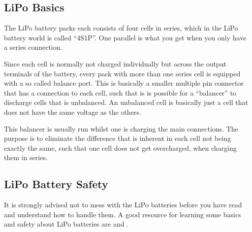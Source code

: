 \subsection{LiPo Basics}
\label{ssc:lipo}
The LiPo battery packs each consists of four cells in series, which in
the LiPo battery world is called ``4S1P''. One parallel is what you get
when you only have a series connection.

Since each cell is normally not charged individually but across the
output terminals of the battery, every pack with more than one series
cell is equipped with a so called balance port. This is basically a
smaller multiple pin connector that has a connection to each cell,
such that is is possible for a ``balancer'' to discharge cells that is
unbalanced. An unbalanced cell is basically just a cell that does not
have the same voltage as the others.

This balancer is usually run whilst one is charging the main
connections. The purpose is to eliminate the difference that is
inherent in each cell not being exactly the same, such that one cell
does not get overcharged, when charging them in series.

\subsection{LiPo Battery Safety}
\begin{tcolorbox}[colback=yellow!75!,colframe=red]
It is strongly advised not to mess with the LiPo batteries before you
have read and understand how to handle them. A good resource for
learning some basics and safety about LiPo batteries are
\citep{tjintech:lipo-basics} and \citep{tjintech:lipo-safety}.
\end{tcolorbox}
 
